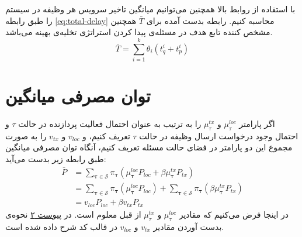 با استفاده از روابط بالا همچنین می‌توانیم میانگین تاخیر سرویس هر وظیفه در سیستم را طبق رابطه \ref{eq:total-delay} محاسبه کنیم. رابطه بدست آمده برای $\bar{T}$ همچنین مشخص کننده تابع هدف در مسئله‌ی پیدا کردن استراتژی تخلیه‌ی بهینه می‌باشد.
\begin{equation}
	\label{eq:total-delay}
	\bar{T}=\sum_{i=1}^{k} \theta_{i}\left(t_{q}^{i}+t_{p}^{i}\right)
\end{equation}
\newpage
\section{توان مصرفی میانگین}
اگر پارامتر
$\mu_\tau^{loc}$
و 
$\mu_\tau^{tx}$
را به ترتیب به عنوان احتمال فعالیت پردازنده در حالت
$\tau$
و احتمال وجود درخواست ارسال وظیفه در حالت
$\tau$
تعریف کنیم، و $v_{loc}$ و $v_{tx}$ را به صورت مجموع این دو پارامتر در فضای حالت مسئله تعریف کنیم، آنگاه توان مصرفی میانگین طبق رابطه زیر بدست می‌آید:
\begin{equation}
	\begin{aligned}
		\bar{P} &=\sum_{\boldsymbol{\tau} \in \mathcal{S}} \pi_{\boldsymbol{\tau}}\left(\mu_{\boldsymbol{\tau}}^{l o c} P_{l o c}+\beta \mu_{\boldsymbol{\tau}}^{t x} P_{t x}\right) \\
		&= \sum_{\boldsymbol{\tau} \in \mathcal{S}} \pi_{\boldsymbol{\tau}}\left(\mu_{\boldsymbol{\tau}}^{l o c} P_{l o c}\right) + \sum_{\boldsymbol{\tau} \in \mathcal{S}} \pi_{\boldsymbol{\tau}}\left(\beta\mu_{\boldsymbol{\tau}}^{t x} P_{t x}\right) \\
		&=v_{loc}P_{loc} + \beta v_{tx}P_{tx}
	\end{aligned}
\end{equation}
در اینجا فرض می‌کنیم که مقادیر $\mu_\tau^{loc}$ و $\mu_\tau^{tx}$ از قبل معلوم است. در \hyperref[appendix:2]{پیوست ۲} نحوه‌ی بدست آوردن مقادیر $v_{tx}$ و $v_{loc}$ در قالب کد شرح داده شده است.
